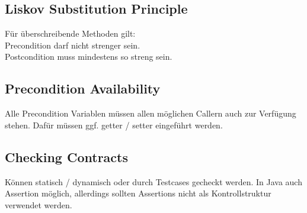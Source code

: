 \subsection{Liskov Substitution Principle}%
\label{dbc:sub:liskov}
Für überschreibende Methoden gilt:\\
Precondition darf nicht strenger sein.\\
Postcondition muss mindestens so streng sein.\\

\subsection{Precondition Availability}%
\label{dbc:sub:precondition}
Alle Precondition Variablen müssen allen möglichen Callern auch zur Verfügung stehen. Dafür müssen ggf. getter / setter
eingeführt werden.

\subsection{Checking Contracts}%
\label{dbc:sub:checking}
Können statisch / dynamisch oder durch Testcases gecheckt werden.
In Java auch Assertion möglich, allerdings sollten Assertions nicht als Kontrollstruktur verwendet werden.
  
    
